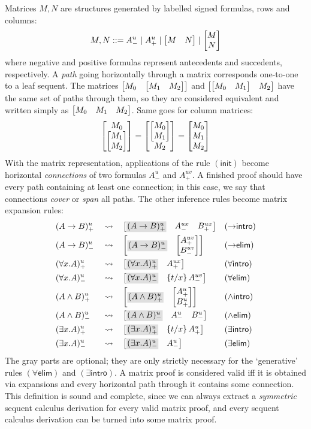 \documentclass[twoside]{report}
\begin{document}
Matrices $M, N$ are structures generated by labelled signed formulas, rows and columns:
$$
M, N ::= A^u_- \mid A^u_+ \mid \begin{bmatrix}M & N\end{bmatrix} \mid \begin{bmatrix}M \\ N\end{bmatrix}
$$
where negative and positive formulas represent antecedents and succedents, respectively. A \emph{path} going horizontally through a matrix corresponds one-to-one to a leaf sequent. The matrices $\begin{bmatrix}M_0 & \begin{bmatrix}M_1 & M_2\end{bmatrix}\end{bmatrix}$ and $\begin{bmatrix}\begin{bmatrix}M_0 & M_1\end{bmatrix} & M_2\end{bmatrix}$ have the same set of paths through them, so they are considered equivalent and written simply as $\begin{bmatrix}M_0 & M_1 & M_2\end{bmatrix}$. Same goes for column matrices:
$$
\begin{bmatrix}M_0 \\ \begin{bmatrix}M_1 \\ M_2\end{bmatrix}\end{bmatrix} = \begin{bmatrix}\begin{bmatrix}M_0 \\ M_1\end{bmatrix} \\ M_2\end{bmatrix} = \begin{bmatrix}M_0 \\ M_1 \\ M_2\end{bmatrix}
$$
With the matrix representation, applications of the rule $(\mathsf{init})$ become horizontal \emph{connections} of two formulas $A^u_-$ and $A^{uv}_+$. A finished proof should have every path containing at least one connection; in this case, we say that connections \emph{cover} or \emph{span} all paths. The other inference rules become matrix expansion rules:
$$
\begin{aligned}
& (A \to B)^u_+ && \rightsquigarrow && \mat{\shade{(A \to B)^u_+} & A^{ux}_- & B^{ux}_+} && ({\to}\mathsf{intro})\\
& (A \to B)^u_- && \rightsquigarrow && \mat{\shade{(A \to B)^u_-} & \mat{A^{uv}_+ \\ B^{uv}_-}} && ({\to}\mathsf{elim})\\
& (\forall x. A)^u_+ && \rightsquigarrow && \mat{\shade{(\forall x. A)^u_+} & A^{ux}_+} && ({\forall}\mathsf{intro})\\
& (\forall x. A)^u_- && \rightsquigarrow && \mat{\shade{(\forall x. A)^u_-} & \subst x t {A^{uv}_-}} && ({\forall}\mathsf{elim})\\
& (A \land B)^u_+ && \rightsquigarrow && \mat{\shade{(A \land B)^u_+} & \mat{A^u_+ \\ B^u_+}} && ({\land}\mathsf{intro})\\
& (A \land B)^u_- && \rightsquigarrow && \mat{\shade{(A \land B)^u_-} & A^u_- & B^u_-} && ({\land}\mathsf{elim})\\
& (\exists x. A)^u_+ && \rightsquigarrow && \mat{\shade{(\exists x. A)^u_+} & \subst x t {A^u_+}} && ({\exists}\mathsf{intro})\\
& (\exists x. A)^u_- && \rightsquigarrow && \mat{\shade{(\exists x. A)^u_-} & A^u_-} && ({\exists}\mathsf{elim})\\
\end{aligned}
$$
The gray parts are optional; they are only strictly necessary for the `generative' rules $(\forall\mathsf{elim})$ and $(\exists\mathsf{intro})$. A matrix proof is considered valid iff it is obtained via expansions and every horizontal path through it contains some connection. This definition is sound and complete, since we can always extract a \emph{symmetric} sequent calculus derivation for every valid matrix proof, and every sequent calculus derivation can be turned into some matrix proof.
\end{document}
